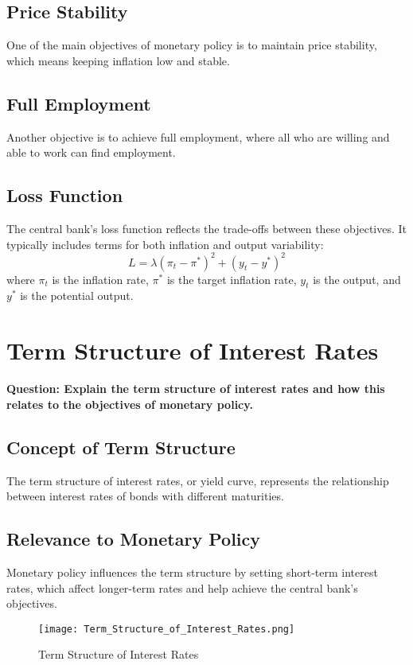 \documentclass{article}
\begin{document}
\subsection{Price Stability}
One of the main objectives of monetary policy is to maintain price stability, which means keeping inflation low and stable.

\subsection{Full Employment}
Another objective is to achieve full employment, where all who are willing and able to work can find employment.

\subsection{Loss Function}
The central bank's loss function reflects the trade-offs between these objectives. It typically includes terms for both inflation and output variability:
\[
L = \lambda (\pi_t - \pi^*)^2 + (y_t - y^*)^2
\]
where $\pi_t$ is the inflation rate, $\pi^*$ is the target inflation rate, $y_t$ is the output, and $y^*$ is the potential output.

\section{Term Structure of Interest Rates}
\textbf{Question: Explain the term structure of interest rates and how this relates to the objectives of monetary policy.}

\subsection{Concept of Term Structure}
The term structure of interest rates, or yield curve, represents the relationship between interest rates of bonds with different maturities.

\subsection{Relevance to Monetary Policy}
Monetary policy influences the term structure by setting short-term interest rates, which affect longer-term rates and help achieve the central bank's objectives.

\begin{figure}[h]
\centering
\texttt{[image: Term\_Structure\_of\_Interest\_Rates.png]}
\caption{Term Structure of Interest Rates}
\end{figure}
\end{document}
